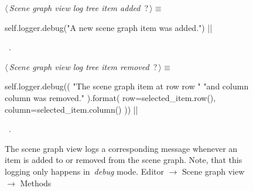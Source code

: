 \documentclass[%
    a4paper,    %
    justified,  %
    nobib,      %
    openany     %
]{tufte-book}
\begin{document}
\begin{figure}
\begin{flushleft} \small
\begin{minipage}{\linewidth}\label{scrap60}\raggedright\small
{} $\langle\,${\itshape Scene graph view log tree item added}\nobreak\ {\footnotesize {?}}$\,\rangle\equiv$
\vspace{-1ex}
\begin{pythoncode}
self.logger.debug("A new scene graph item was added.")
|\NWsep|
\end{pythoncode}
\vspace{1.5ex}
\footnotesize
\begin{list}{}{\setlength{\itemsep}{-\parsep}\setlength{\itemindent}{-\leftmargin}}
\item \NWtxtMacroRefIn\ .

\item{}
\end{list}
\end{minipage}\vspace{4ex}
\end{flushleft}
\begin{flushleft} \small
\begin{minipage}{\linewidth}\label{scrap61}\raggedright\small
{} $\langle\,${\itshape Scene graph view log tree item removed}\nobreak\ {\footnotesize {?}}$\,\rangle\equiv$
\vspace{-1ex}
\begin{pythoncode}
self.logger.debug((
    "The scene graph item at row {row} "
    "and column {column} was removed."
).format(
    row=selected_item.row(),
    column=selected_item.column()
))
|\NWsep|
\end{pythoncode}
\vspace{1.5ex}
\footnotesize
\begin{list}{}{\setlength{\itemsep}{-\parsep}\setlength{\itemindent}{-\leftmargin}}
\item \NWtxtMacroRefIn\ .

\item{}
\end{list}
\end{minipage}\vspace{4ex}
\end{flushleft}
\caption{The scene graph view logs a corresponding message whenever an item is
  added to or removed from the scene graph. Note, that this logging only happens
  in~\emph{debug} mode.
  \newline{}\newline{}Editor $\rightarrow$ Scene graph view
  $\rightarrow$ Methods}
\label{logging:lst:scene-graph-view:methods:log-adding-removal}
\end{figure}
\end{document}
